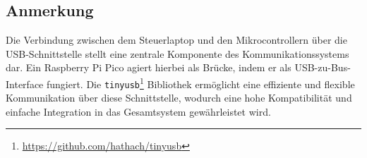 \subsection{Anmerkung}\label{text:Methodik:Kommunikation:Anmerkung}

Die Verbindung zwischen dem Steuerlaptop und den Mikrocontrollern über die USB-Schnittstelle stellt eine zentrale Komponente des Kommunikationssystems dar. Ein Raspberry Pi Pico agiert hierbei als Brücke, indem er als USB-zu-Bus-Interface fungiert. Die \lstinline{tinyusb}\footnote{\url{https://github.com/hathach/tinyusb}} Bibliothek ermöglicht eine effiziente und flexible Kommunikation über diese Schnittstelle, wodurch eine hohe Kompatibilität und einfache Integration in das Gesamtsystem gewährleistet wird.
